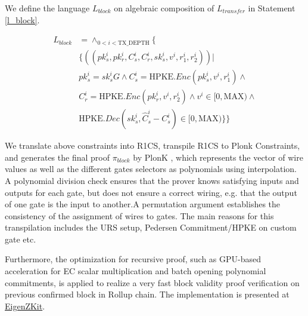 \documentclass{article}
\begin{document}
We define the language $L_{block}$ on algebraic composition of $L_{transfer}$ in Statement \ref{l_block}.

\begin{equation}
\begin{aligned} \label{l_block}
    L_{block} &= \wedge_{0 < i < \mbox{TX\_DEPTH}} \{  \\
        &\{((pk_s^i, pk_r^i, C_s^i, C_r^i, sk_s^i, v^i, r_1^i, r_2^i)) | \\ 
        &pk_s^i = sk_s^iG \land C_s^i = \mbox{HPKE}.Enc(pk_s^i,v^i, r_1^i) \land \\
        &C_r^i =  \mbox{HPKE}.Enc(pk_r^i,v^i, r_2^i) \land v^i \in [0, \mbox{MAX}) \land \\
        &\mbox{HPKE}.Dec(sk_s^i, \hat{C}_s^i - C_s^i) \in [0, \mbox{MAX})\}\}
\end{aligned}
\end{equation}

We translate above constraints into R1CS, transpile R1CS to Plonk Constraints, and generates the final proof $\pi_{block}$ by PlonK \cite{gabizon2019plonk}, which represents the vector of wire values as well as the different gates selectors as polynomials using interpolation. A polynomial division check ensures that the prover knows satisfying inputs and outputs for each gate, but does not ensure a correct wiring, e.g. that the output of one gate is the input to another.A permutation argument establishes the consistency of the assignment of wires to gates. The main reasons for this transpilation includes the URS setup, Pedersen Commitment/HPKE on custom gate etc.

Furthermore, the optimization for recursive proof, such as GPU-based acceleration for EC scalar multiplication and batch opening polynomial commitments, is applied to realize a very fast block validity proof verification on previous confirmed block in Rollup chain. The implementation is presented at \href{https://github.com/ieigen/EigenZKit}{EigenZKit}.


\begin{appendices}

\end{appendices}




\end{document}
